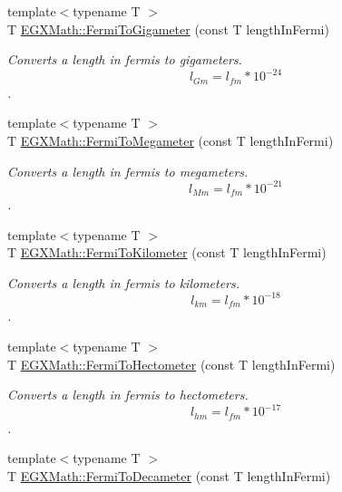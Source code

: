 \begin{DoxyCompactItemize}
{\footnotesize template$<$typename T $>$ }\\T \mbox{\hyperlink{group___e_g_x_math-_conversions-_length_conversions-_non-_s_i-_fermi-_s_i_gab1a1a212d0f0091293bc41c7c9cf5f41}{E\+G\+X\+Math\+::\+Fermi\+To\+Gigameter}} (const T length\+In\+Fermi)
\begin{DoxyCompactList}\small\item\em Converts a length in fermis to gigameters. \[ l_{Gm}=l_{fm} * 10^{-24} \]. \end{DoxyCompactList}\item 
{\footnotesize template$<$typename T $>$ }\\T \mbox{\hyperlink{group___e_g_x_math-_conversions-_length_conversions-_non-_s_i-_fermi-_s_i_ga5a9bfb0faa55f320e61263103a17da64}{E\+G\+X\+Math\+::\+Fermi\+To\+Megameter}} (const T length\+In\+Fermi)
\begin{DoxyCompactList}\small\item\em Converts a length in fermis to megameters. \[ l_{Mm}=l_{fm} * 10^{-21} \]. \end{DoxyCompactList}\item 
{\footnotesize template$<$typename T $>$ }\\T \mbox{\hyperlink{group___e_g_x_math-_conversions-_length_conversions-_non-_s_i-_fermi-_s_i_ga9401eb4ce5a32e0c67244eba800b1fd4}{E\+G\+X\+Math\+::\+Fermi\+To\+Kilometer}} (const T length\+In\+Fermi)
\begin{DoxyCompactList}\small\item\em Converts a length in fermis to kilometers. \[ l_{km}=l_{fm} * 10^{-18} \]. \end{DoxyCompactList}\item 
{\footnotesize template$<$typename T $>$ }\\T \mbox{\hyperlink{group___e_g_x_math-_conversions-_length_conversions-_non-_s_i-_fermi-_s_i_ga0412e30a3ebf380fdde7f67793d35ebd}{E\+G\+X\+Math\+::\+Fermi\+To\+Hectometer}} (const T length\+In\+Fermi)
\begin{DoxyCompactList}\small\item\em Converts a length in fermis to hectometers. \[ l_{hm}=l_{fm} * 10^{-17} \]. \end{DoxyCompactList}\item 
{\footnotesize template$<$typename T $>$ }\\T \mbox{\hyperlink{group___e_g_x_math-_conversions-_length_conversions-_non-_s_i-_fermi-_s_i_ga7119536a4a74664e533c6bdfa1deba71}{E\+G\+X\+Math\+::\+Fermi\+To\+Decameter}} (const T length\+In\+Fermi)

\end{DoxyCompactItemize}
